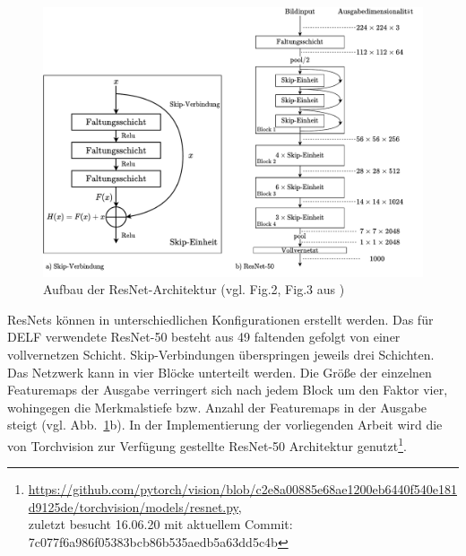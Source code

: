 \begin{figure}[h]
\includegraphics[scale=0.70]{resnet-50.pdf}
\caption{Aufbau der ResNet-Architektur (vgl. Fig.2, Fig.3 aus \cite{resnet})}
\label{resnet}
\end{figure}
ResNets können in unterschiedlichen Konfigurationen erstellt werden. Das für DELF verwendete \mbox{ResNet-50} besteht aus 49 faltenden gefolgt von einer vollvernetzen Schicht. Skip-Verbindungen überspringen jeweils drei Schichten. Das Netzwerk kann in vier Blöcke unterteilt werden. Die Größe der einzelnen Featuremaps der Ausgabe verringert sich nach jedem Block um den Faktor vier, wohingegen die Merkmalstiefe bzw. Anzahl der Featuremaps in der Ausgabe steigt (vgl. Abb.~\ref{resnet}b). In der Implementierung der vorliegenden Arbeit wird die von Torchvision zur Verfügung gestellte ResNet-50 Architektur genutzt\footnote{\url{https://github.com/pytorch/vision/blob/c2e8a00885e68ae1200eb6440f540e181d9125de/torchvision/models/resnet.py},\\ zuletzt besucht 16.06.20 mit aktuellem Commit: 7c077f6a986f05383bcb86b535aedb5a63dd5c4b}. 


